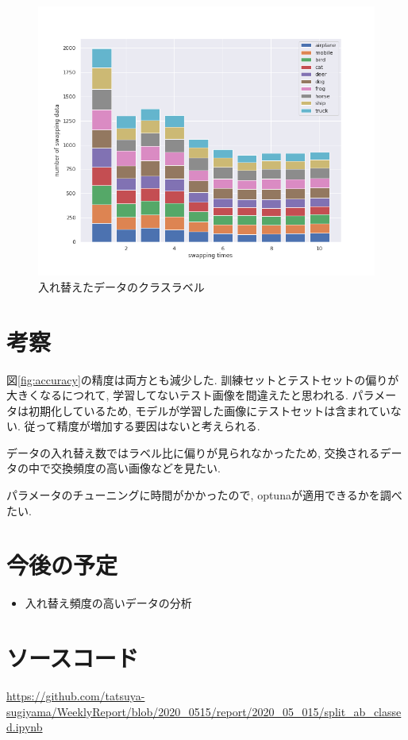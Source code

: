 \documentclass[twocolumn]{jarticle}     %
\begin{document}
\begin{figure}[tb]
  \begin{center}
    \includegraphics[clip,width=16.5cm]{swapclass.png}
    \caption{入れ替えたデータのクラスラベル}
    \label{fig:class}
  \end{center}
\end{figure}

\section{考察}
図\ref{fig:accuracy}の精度は両方とも減少した. 訓練セットとテストセットの偏りが大きくなるにつれて, 学習してないテスト画像を間違えたと思われる. パラメータは初期化しているため, モデルが学習した画像にテストセットは含まれていない. 従って精度が増加する要因はないと考えられる.

データの入れ替え数ではラベル比に偏りが見られなかったため, 交換されるデータの中で交換頻度の高い画像などを見たい.

パラメータのチューニングに時間がかかったので, optunaが適用できるかを調べたい.

\section{今後の予定}
\begin{itemize}
	\item {入れ替え頻度の高いデータの分析}
\end{itemize}

\section{ソースコード}

\url{https://github.com/tatsuya-sugiyama/WeeklyReport/blob/2020_0515/report/2020_05_015/split_ab_classed.ipynb}





\end{document}
